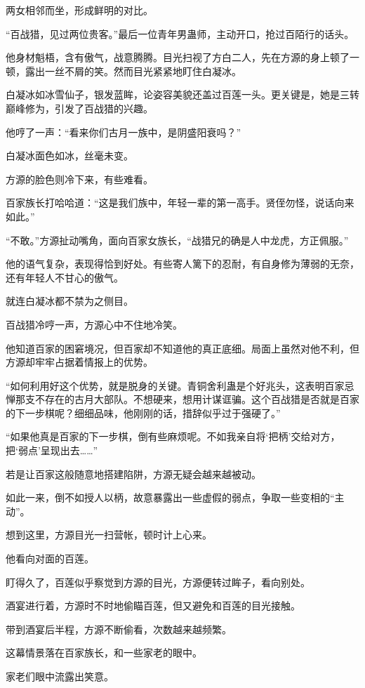 \begin{this_body}
两女相邻而坐，形成鲜明的对比。

“百战猎，见过两位贵客。”最后一位青年男蛊师，主动开口，抢过百陌行的话头。

他身材魁梧，含有傲气，战意腾腾。目光扫视了方白二人，先在方源的身上顿了一顿，露出一丝不屑的笑。然而目光紧紧地盯住白凝冰。

白凝冰如冰雪仙子，银发蓝眸，论姿容美貌还盖过百莲一头。更关键是，她是三转巅峰修为，引发了百战猎的兴趣。

他哼了一声：“看来你们古月一族中，是阴盛阳衰吗？”

白凝冰面色如冰，丝毫未变。

方源的脸色则冷下来，有些难看。

百家族长打哈哈道：“这是我们族中，年轻一辈的第一高手。贤侄勿怪，说话向来如此。”

“不敢。”方源扯动嘴角，面向百家女族长，“战猎兄的确是人中龙虎，方正佩服。”

他的语气复杂，表现得恰到好处。有些寄人篱下的忍耐，有自身修为薄弱的无奈，还有年轻人不甘心的傲气。

就连白凝冰都不禁为之侧目。

百战猎冷哼一声，方源心中不住地冷笑。

他知道百家的困窘境况，但百家却不知道他的真正底细。局面上虽然对他不利，但方源却牢牢占据着情报上的优势。

“如何利用好这个优势，就是脱身的关键。青铜舍利蛊是个好兆头，这表明百家忌惮那支不存在的古月大部队。不想硬来，想用计谋诓骗。这个百战猎是否就是百家的下一步棋呢？细细品味，他刚刚的话，措辞似乎过于强硬了。”

“如果他真是百家的下一步棋，倒有些麻烦呢。不如我亲自将‘把柄’交给对方，把‘弱点’呈现出去……”

若是让百家这般随意地搭建陷阱，方源无疑会越来越被动。

如此一来，倒不如授人以柄，故意暴露出一些虚假的弱点，争取一些变相的“主动”。

想到这里，方源目光一扫营帐，顿时计上心来。

他看向对面的百莲。

盯得久了，百莲似乎察觉到方源的目光，方源便转过眸子，看向别处。

酒宴进行着，方源时不时地偷瞄百莲，但又避免和百莲的目光接触。

带到酒宴后半程，方源不断偷看，次数越来越频繁。

这幕情景落在百家族长，和一些家老的眼中。

家老们眼中流露出笑意。


\end{this_body}
